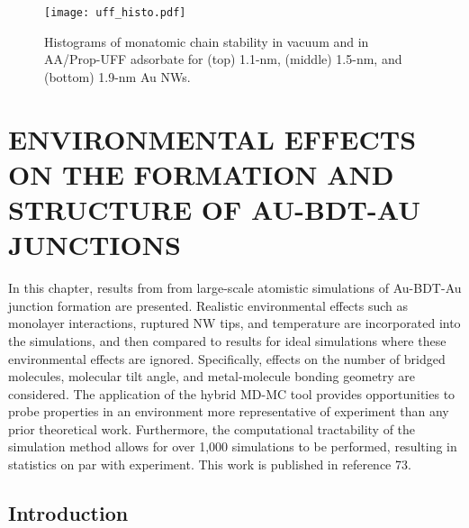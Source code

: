\documentclass[10pt]{report}  %
\newcommand\findent{\hspace*{\parindent}}
\begin{document}
% 
%
\begin{figure}[]
	\centering
	\texttt{[image: uff\_histo.pdf]}
	\caption{ Histograms of monatomic chain stability in vacuum and in AA/Prop-UFF adsorbate for (top) 1.1-nm, (middle) 1.5-nm, and (bottom) 1.9-nm Au NWs. }
	\label{fig:uff_histo}
\end{figure}  


%
%
%
%
\chapter{ENVIRONMENTAL EFFECTS ON THE FORMATION AND STRUCTURE OF AU-BDT-AU JUNCTIONS}

\findent In this chapter, results from from large-scale atomistic simulations of Au-BDT-Au junction formation are presented. Realistic environmental effects such as monolayer interactions, ruptured NW tips, and temperature are incorporated into the simulations, and then compared to results for ideal simulations where these environmental effects are ignored. Specifically, effects on the number of bridged molecules, molecular tilt angle, and metal-molecule bonding geometry are considered. The application of the hybrid MD-MC tool provides opportunities to probe properties in an environment more representative of experiment than any prior theoretical work.\cite{Emberly:2001,Weber:2002,Li:2008,Mishchenko:2010,Frei:2011} Furthermore, the computational tractability of the simulation method allows for over 1,000 simulations to be performed, resulting in statistics on par with experiment. This work is published in reference 73.

\section{Introduction}
\end{document}
